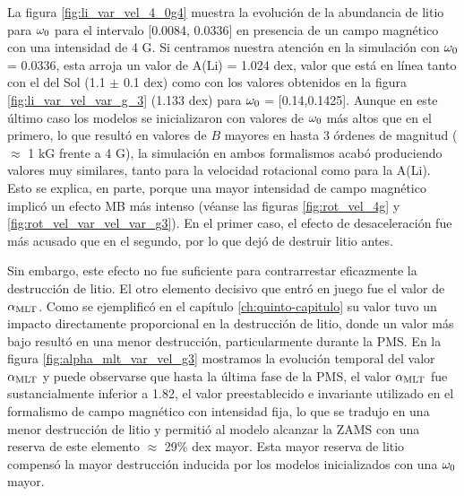 La figura \ref{fig:li_var_vel_4_0g4} muestra la evolución de la abundancia de litio para $\omega_{\mathrm{0}}$ para el intervalo [0.0084, 0.0336] en presencia de un campo magnético con una intensidad de 4 G. Si centramos nuestra atención en la simulación con $\omega_{\mathrm{0}}$ = 0.0336, esta arroja un valor de A(Li) = 1.024 dex, valor que está en línea tanto con el del Sol (1.1 $\pm$ 0.1 dex) como con los valores obtenidos en la figura \ref{fig:li_var_vel_var_g_3} (1.133 dex) para $\omega_{\mathrm{0}}$ = [0.14,0.1425]. Aunque en este último caso los modelos se inicializaron con valores de $\omega_{\mathrm{0}}$ más altos que en el primero, lo que resultó en valores de $B$ mayores en hasta 3 órdenes de magnitud ($\approx$ 1 kG frente a 4 G), la simulación en ambos formalismos acabó produciendo valores muy similares, tanto para la velocidad rotacional como para la A(Li). Esto se explica, en parte, porque una mayor intensidad de campo magnético implicó un efecto MB más intenso (véanse las figuras \ref{fig:rot_vel_4g} y \ref{fig:rot_vel_var_vel_var_g3}). En el primer caso, el efecto de desaceleración fue más acusado que en el segundo, por lo que dejó de destruir litio antes.\par

Sin embargo, este efecto no fue suficiente para contrarrestar eficazmente la destrucción de litio. El otro elemento decisivo que entró en juego fue el valor de $\alpha_{\mathrm{MLT}}$. Como se ejemplificó en el capítulo \ref{ch:quinto-capitulo} su valor tuvo un impacto directamente proporcional en la destrucción de litio, donde un valor más bajo resultó en una menor destrucción, particularmente durante la PMS. En la figura \ref{fig:alpha_mlt_var_vel_g3} mostramos la evolución temporal del valor $\alpha_{\mathrm{MLT}}$ y puede observarse que hasta la última fase de la PMS, el valor $\alpha_{\mathrm{MLT}}$ fue sustancialmente inferior a 1.82, el valor preestablecido e invariante utilizado en el formalismo de campo magnético con intensidad fija, lo que se tradujo en una menor destrucción de litio y permitió al modelo alcanzar la ZAMS con una reserva de este elemento $\approx$ 29\% dex mayor. Esta mayor reserva de litio compensó la mayor destrucción inducida por los modelos inicializados con una $\omega_{\mathrm{0}}$ mayor.\par

